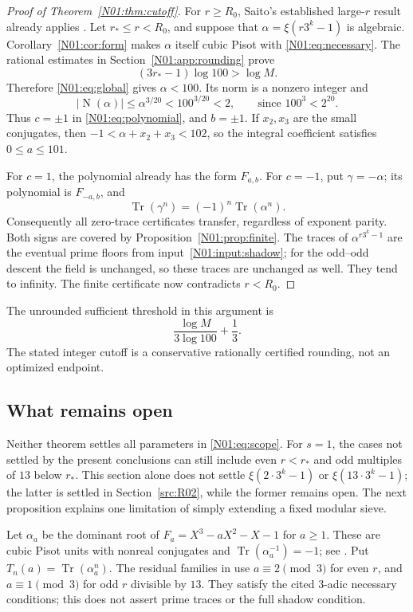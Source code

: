 \documentclass[11pt,a4paper]{article}
\theoremstyle{definition}\newtheorem{definition}[theorem]{Definition}
\theoremstyle{remark}\newtheorem{remark}[theorem]{Remark}
\DeclareMathOperator{\Tr}{Tr}\DeclareMathOperator{\tr}{tr}\DeclareMathOperator{\Nm}{N}
\begin{document}
\begin{proof}[Proof of Theorem~\ref{N01:thm:cutoff}]
For $r\ge R_0$, Saito's established large-$r$ result already applies
\cite[Theorem~1.9(C)]{Saito}. Let $r_*\le r<R_0$, and suppose that
$\alpha=\xi(r3^k-1)$ is algebraic. Corollary~\ref{N01:cor:form} makes
$\alpha$ itself cubic Pisot with \eqref{N01:eq:necessary}.
The rational estimates in Section~\ref{N01:app:rounding} prove
\[
 (3r_*-1)\log100>\log M.
\]
Therefore \eqref{N01:eq:global} gives $\alpha<100$.
Its norm is a nonzero integer and
\[
 |\Nm(\alpha)|\le\alpha^{3/20}<100^{3/20}<2,
 \qquad\text{since }100^3<2^{20}.
\]
Thus $c=\pm1$ in \eqref{N01:eq:polynomial}, and $b=\pm1$.
If $x_2,x_3$ are the small conjugates, then
$-1<\alpha+x_2+x_3<102$, so the integral coefficient satisfies
$0\le a\le101$.

For $c=1$, the polynomial already has the form $F_{a,b}$.
For $c=-1$, put $\gamma=-\alpha$; its polynomial is $F_{-a,b}$,
and
\[
 \Tr(\gamma^n)=(-1)^n\Tr(\alpha^n).
\]
Consequently all zero-trace certificates transfer, regardless of
exponent parity. Both signs are covered by Proposition~\ref{N01:prop:finite}.
The traces of $\alpha^{r3^k-1}$ are the eventual prime floors from
input~\ref{N01:input:shadow}; for the odd--odd descent the field is
unchanged, so these traces are unchanged as well. They tend to
infinity. The finite certificate now contradicts $r<R_0$.
\end{proof}

The unrounded sufficient threshold in this argument is
\[
 \frac{\log M}{3\log100}+\frac13.
\]
The stated integer cutoff is a conservative rationally certified
rounding, not an optimized endpoint.

\subsection{What remains open}

Neither theorem settles all parameters in \eqref{N01:eq:scope}.
For $s=1$, the cases not settled by the present conclusions can
still include even $r<r_*$ and odd multiples of $13$ below $r_*$.
This section alone does not settle $\xi(2\cdot3^k-1)$ or $\xi(13\cdot3^k-1)$; the latter is settled in Section~\ref{src:R02}, while the former remains open.
The next proposition explains one limitation of simply extending
a fixed modular sieve.

Let $\alpha_a$ be the dominant root of
$F_a=X^3-aX^2-X-1$ for $a\ge1$. These are cubic Pisot units with
nonreal conjugates and $\Tr(\alpha_a^{-1})=-1$; see
\cite[Section~7.1]{K064}. Put $T_n(a)=\Tr(\alpha_a^n)$.
The residual families in \cite[Section~7]{K064} use
$a\equiv2\pmod3$ for even $r$, and $a\equiv1\pmod3$ for odd
$r$ divisible by $13$. They satisfy the cited $3$-adic necessary
conditions; this does not assert prime traces or the full shadow condition.
\end{document}
